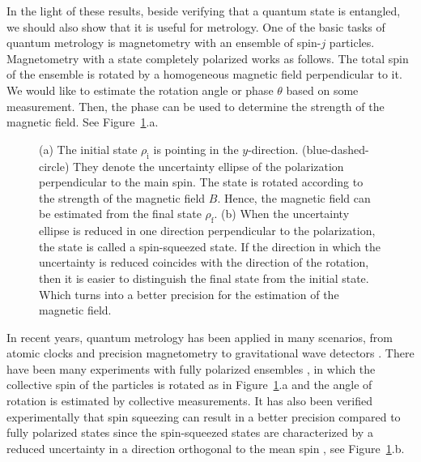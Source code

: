 In the light of these results, beside verifying that a quantum state is entangled, we should also show that it is useful for metrology.
One of the basic tasks of quantum metrology is magnetometry with an ensemble of spin-$j$ particles.
Magnetometry with a state completely polarized works as follows.
The total spin of the ensemble is rotated by a homogeneous magnetic field perpendicular to it.
We would like to estimate the rotation angle or phase $\theta$ based on some measurement.
Then, the phase can be used to determine the strength of the magnetic field.
See Figure~\ref{fig:int-magnetometry-totally-polarized}.a.
\begin{figure}[htp]
  \centering
  \caption[How spin-squeezed states improve the precision]{(a) The initial state $\rho_{\text{i}}$ is pointing in the $y$-direction.
  (blue-dashed-circle) They denote the uncertainty ellipse of the polarization perpendicular to the main spin.
  The state is rotated according to the strength of the magnetic field $B$.
  Hence, the magnetic field can be estimated from the final state $\rho_{\text{f}}$.
  (b) When the uncertainty ellipse is reduced in one direction perpendicular to the polarization, the state is called a spin-squeezed state.
  If the direction in which the uncertainty is reduced coincides with the direction of the rotation, then it is easier to distinguish the final state from the initial state.
  Which turns into a better precision for the estimation of the magnetic field.}
  \label{fig:int-magnetometry-totally-polarized}
\end{figure}

In recent years, quantum metrology has been applied in many scenarios, from atomic clocks \cite{Louchet-Chauvet2010, Borregaard2013, Kessler2014a} and precision magnetometry \cite{Wasilewski2010, Eckert2006, Wildermuth2006, Wolfgramm2010, Koschorreck2011, Vengalattore2007, Zhou2010} to gravitational wave detectors \cite{Schnabel2010, TheLIGOScientificCollaboration2011, Demkowicz-Dobrzanski2013}.
There have been many experiments with fully polarized ensembles \cite{Gross2012, Wasilewski2010, Wildermuth2006, Vengalattore2007, Behbood2013, Koschorreck2011, Muessel2014}, in which the collective spin of the particles is rotated as in Figure~\ref{fig:int-magnetometry-totally-polarized}.a and the angle of rotation is estimated by collective measurements.
It has also been verified experimentally that spin squeezing can result in a better precision compared to fully polarized states \cite{Riedel2010, Gross2012, Wasilewski2010, Muessel2014, Fernholz2008, Hald1999, Julsgaard2001, Hammerer2010, Esteve2008} since the spin-squeezed states are characterized by a reduced uncertainty in a direction orthogonal to the mean spin \cite{Kitagawa1993, Wineland1994, Sorensen2001, Ma2011}, see Figure~\ref{fig:int-magnetometry-totally-polarized}.b.

